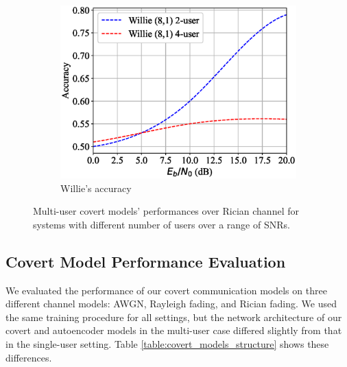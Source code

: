 \begin{figure}[tp!]
\begin{subfigure}{0.28\textwidth}
		\includegraphics[width=\linewidth]{figs/multi_willie_accuracy_rician}
		\caption{Willie's accuracy}
		\label{fig:multi_rician_results_willie}
	\end{subfigure}
	\caption{Multi-user covert models' performances over Rician channel for systems with different number of users over a range of SNRs.}
	\label{fig:multi_rician_results}
\end{figure}

\subsection{Covert Model Performance Evaluation}
We evaluated the performance of our covert communication models on three different channel models: AWGN, Rayleigh fading, and Rician fading. We used the same training procedure for all settings, but the network architecture of our covert and autoencoder models in the multi-user case differed slightly from that in the single-user setting. Table \ref{table:covert_models_structure} shows these differences.

